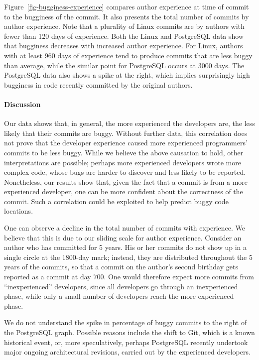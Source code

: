 Figure~\ref{fig-bugginess-experience} compares author experience at time of
commit to the bugginess of the commit. It also presents the total number of
commits by author experience. Note that a plurality of Linux commits are by
authors with fewer than 120 days of experience.  Both the Linux and PostgreSQL
data show that bugginess decreases with increased author experience. For Linux,
authors with at least 960 days of experience tend to produce commits that are
less buggy than average, while the similar point for PostgreSQL occurs at 3000
days.  The PostgreSQL data also shows a spike at the right, which implies
surprisingly high bugginess in code recently committed by the original authors.

\paragraph{Discussion}

Our data shows that, in general, the more experienced the developers are, the
less likely that their commits are buggy.  Without further data, this
correlation does not prove that the developer experience caused more experienced
programmers' commits to be less buggy.  While we believe the above causation to
hold, other interpretations are possible; perhaps more experienced developers
wrote more complex code, whose bugs are harder to discover and less likely to be
reported.  Nonetheless, our results show that, given the fact that a commit is
from a more experienced developer, one can be more confident about the
correctness of the commit. Such a correlation could be exploited to help predict
buggy code locations.

One can observe a decline in the total number of commits with experience.
We believe that this is due to our sliding scale for author experience.
Consider an author who has committed for 5 years. His or her commits do not
show up in a single circle at the 1800-day mark; instead, they are distributed
throughout the 5 years of the commits, so that a commit on the author's second
birthday gets reported as a commit at day 700. One would therefore expect
more commits from ``inexperienced'' developers, since all developers go through
an inexperienced phase, while only a small number of developers reach the
more experienced phase.

We do not understand the spike in percentage of buggy commits to the
right of the PostgreSQL graph.  Possible reasons include the shift to
Git, which is a known historical event, or, more speculatively,
perhaps PostgreSQL recently undertook major ongoing architectural
revisions, carried out by the experienced developers.

